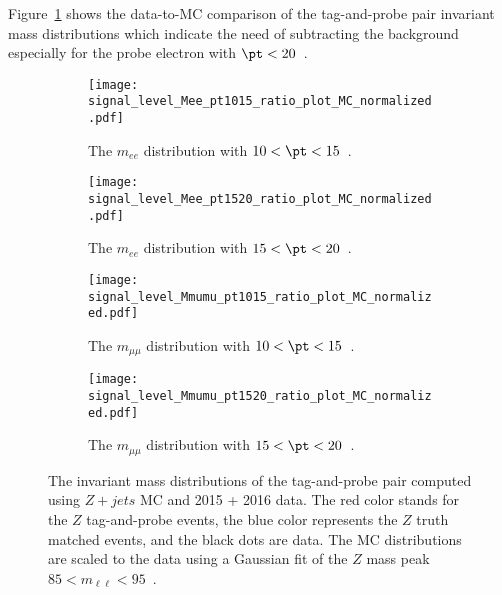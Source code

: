 Figure~\ref{fig:app_RLE_mll_distributions} shows the data-to-MC comparison of the tag-and-probe pair invariant mass distributions which indicate the need of subtracting the background especially for the probe electron with $\pt < 20$~{\GeV}.
%
\begin{figure}[htb]
    \begin{center}
        \begin{subfigure}[b]{0.48\textwidth}
            \begin{center}
                \texttt{[image: signal\_level\_Mee\_pt1015\_ratio\_plot\_MC\_normalized.pdf]}
                \caption{The $m_{ee}$ distribution with $10 < \pt < 15$~{\GeV}.}
            \end{center}
        \end{subfigure}%
        \begin{subfigure}[b]{0.48\textwidth}
            \begin{center}
                \texttt{[image: signal\_level\_Mee\_pt1520\_ratio\_plot\_MC\_normalized.pdf]}
                \caption{The $m_{ee}$ distribution with $15 < \pt < 20$~{\GeV}.}
            \end{center}
        \end{subfigure}
        \begin{subfigure}[b]{0.48\textwidth}
            \begin{center}
                \texttt{[image: signal\_level\_Mmumu\_pt1015\_ratio\_plot\_MC\_normalized.pdf]}
                \caption{The $m_{\mu\mu}$ distribution with $10 < \pt < 15$~{\GeV}.}
            \end{center}
        \end{subfigure}%
        \begin{subfigure}[b]{0.48\textwidth}
            \begin{center}
                \texttt{[image: signal\_level\_Mmumu\_pt1520\_ratio\_plot\_MC\_normalized.pdf]}
                \caption{The $m_{\mu\mu}$ distribution with $15 < \pt < 20$~{\GeV}.}
            \end{center}
        \end{subfigure}
    \end{center}
    \caption{The invariant mass distributions of the tag-and-probe pair computed using $Z+jets$ MC and 2015 + 2016 data.
    The red color stands for the $Z$ tag-and-probe events, the blue color represents the $Z$ truth matched events, and the black dots are data.
    The MC distributions are scaled to the data using a Gaussian fit of the $Z$ mass peak $85 < m_{\ell \ell} < 95$~{\GeV}.}
    \label{fig:app_RLE_mll_distributions}
\end{figure}
